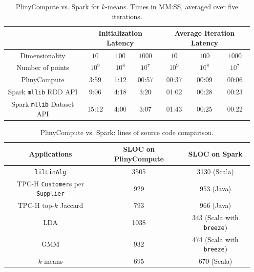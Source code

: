\begin{table}[h!]
\begin{center}
\begin{tabular}{|c||c|c|c||c|c|c|}
\hline
& \multicolumn{3}{c||}{Initialization Latency} & \multicolumn{3}{c|}{Average
                                         Iteration Latency} \\
\hline
Dimensionality & $10$ & $100$ & $1000$ & $10$ & $100$ & $1000$\\
Number of points & $10^9$ & $10^8$ & $10^7$ & $10^9$ & $10^8$ & $10^7$\\
\hline
PlinyCompute &3:59 & 1:12 & 00:57 &00:37 & 00:09 & 00:06\\
Spark \texttt{mllib} RDD API &9:06  &4:18 &3:20 &01:02 & 00:28 & 00:23\\
Spark \texttt{mllib} Dataset API &15:12  &4:00 &3:07 &01:43 & 00:25 & 00:22\\
\hline
\end{tabular}
\caption{PlinyCompute vs. Spark for $k$-means. Times in MM:SS, averaged over five iterations.}
\label{fig:KMeans}
\end{center}
\end{table}


\begin{table}[h!]
\begin{center}
\begin{tabular}{|c||c|c|}
\hline
Applications & SLOC on PlinyCompute & SLOC on Spark\\
\hline
\texttt{lilLinAlg} &3505& 3130 (Scala)\\
TPC-H \texttt{Customer}s per \texttt{Supplier}&929 &953 (Java)\\
TPC-H top-$k$ Jaccard &793 & 966 (Java)\\
LDA &1038  &343 (Scala with \texttt{breeze})\\
GMM&932 & 474 (Scala with \texttt{breeze})\\
$k$-means &695  &670 (Scala)\\
\hline
\end{tabular}
\caption{PlinyCompute vs. Spark: lines of source code comparison.}
\label{fig:LOC}
\end{center}
\end{table}


